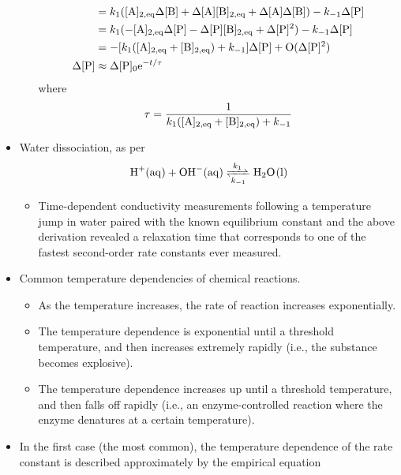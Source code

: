 \documentclass[../notes.tex]{subfiles}
\begin{document}
\begin{itemize}
\begin{itemize}
\begin{align*}
            &= k_1([\ce{A}]_{2,\text{eq}}\Delta[\ce{B}]+\Delta[\ce{A}][\ce{B}]_{2,\text{eq}}+\Delta[\ce{A}]\Delta[\ce{B}])-k_{-1}\Delta[\ce{P}]\\
            &= k_1(-[\ce{A}]_{2,\text{eq}}\Delta[\ce{P}]-\Delta[\ce{P}][\ce{B}]_{2,\text{eq}}+\Delta[\ce{P}]^2)-k_{-1}\Delta[\ce{P}]\\
            &= -[k_1([\ce{A}]_{2,\text{eq}}+[\ce{B}]_{2,\text{eq}})+k_{-1}]\Delta[\ce{P}]+\text{O}(\Delta[\ce{P}]^2)\\
            \Delta[\ce{P}] &\approx \Delta[\ce{P}]_0\e[-t/\tau]
        \end{align*}
        where
        \begin{equation*}
            \tau = \frac{1}{k_1([\ce{A}]_{2,\text{eq}}+[\ce{B}]_{2,\text{eq}})+k_{-1}}
        \end{equation*}
    \end{itemize}
    \item Water dissociation, as per
    \begin{equation*}
        \ce{H+(aq) + OH-(aq) <=>[$k_1$][$k_{-1}$] H2O(l)}
    \end{equation*}
    \begin{itemize}
        \item Time-dependent conductivity measurements following a temperature jump in water paired with the known equilibrium constant and the above derivation revealed a relaxation time that corresponds to one of the fastest second-order rate constants ever measured.
    \end{itemize}
    \item Common temperature dependencies of chemical reactions.
    \begin{itemize}
        \item As the temperature increases, the rate of reaction increases exponentially.
        \item The temperature dependence is exponential until a threshold temperature, and then increases extremely rapidly (i.e., the substance becomes explosive).
        \item The temperature dependence increases up until a threshold temperature, and then falls off rapidly (i.e., an enzyme-controlled reaction where the enzyme denatures at a certain temperature).
    \end{itemize}
    \item In the first case (the most common), the temperature dependence of the rate constant is described approximately by the empirical equation

\end{itemize}
\end{document}
